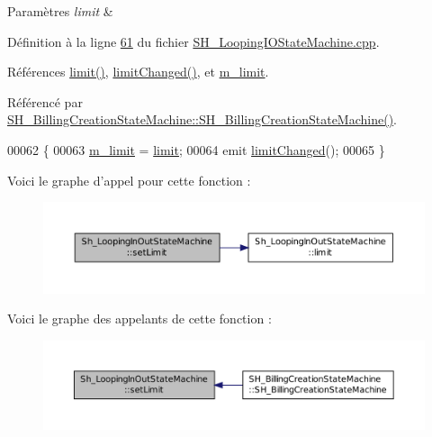 \begin{DoxyParams}{Paramètres}
{\em limit} & \\
\hline
\end{DoxyParams}


Définition à la ligne \hyperlink{SH__LoopingIOStateMachine_8cpp_source_l00061}{61} du fichier \hyperlink{SH__LoopingIOStateMachine_8cpp_source}{S\-H\-\_\-\-Looping\-I\-O\-State\-Machine.\-cpp}.



Références \hyperlink{classSh__LoopingInOutStateMachine_ac44b7158256f09b878c8958cf3ae3bf8}{limit()}, \hyperlink{classSh__LoopingInOutStateMachine_a6d20b3e0b70c0f078b6786048960db51}{limit\-Changed()}, et \hyperlink{classSh__LoopingInOutStateMachine_a320ece6cf74c2667c70059b9421117fb}{m\-\_\-limit}.



Référencé par \hyperlink{classSH__BillingCreationStateMachine_ad62b77fa4aeafe200056ff3974562f83}{S\-H\-\_\-\-Billing\-Creation\-State\-Machine\-::\-S\-H\-\_\-\-Billing\-Creation\-State\-Machine()}.


\begin{DoxyCode}
00062 \{
00063     \hyperlink{classSh__LoopingInOutStateMachine_a320ece6cf74c2667c70059b9421117fb}{m\_limit} = \hyperlink{classSh__LoopingInOutStateMachine_ac44b7158256f09b878c8958cf3ae3bf8}{limit};
00064     emit \hyperlink{classSh__LoopingInOutStateMachine_a6d20b3e0b70c0f078b6786048960db51}{limitChanged}();
00065 \}
\end{DoxyCode}


Voici le graphe d'appel pour cette fonction \-:\nopagebreak
\begin{figure}[H]
\begin{center}
\leavevmode
\includegraphics[width=350pt]{classSh__LoopingInOutStateMachine_a34e317bd7e5aa9fed88fb6df90c85f16_cgraph}
\end{center}
\end{figure}




Voici le graphe des appelants de cette fonction \-:\nopagebreak
\begin{figure}[H]
\begin{center}
\leavevmode
\includegraphics[width=350pt]{classSh__LoopingInOutStateMachine_a34e317bd7e5aa9fed88fb6df90c85f16_icgraph}
\end{center}
\end{figure}


